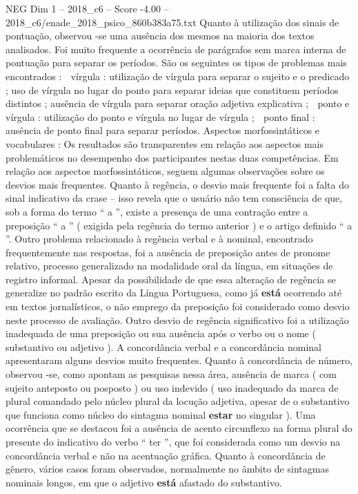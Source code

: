 \begin{textsample}{NEG Dim 1 – 2018\_c6 – Score -4.00 – 2018\_c6/enade\_2018\_psico\_860b383a75.txt}
Quanto à utilização dos sinais de pontuação, observou -se uma ausência dos mesmos na maioria dos textos analisados.
Foi muito frequente a ocorrência de parágrafos sem marca interna de pontuação para separar os períodos.
São os seguintes os tipos de problemas mais encontrados :  vírgula : utilização de vírgula para separar o sujeito e o predicado ; uso de vírgula no lugar do ponto para separar ideias que constituem períodos distintos ; ausência de vírgula para separar oração adjetiva explicativa ;  ponto e vírgula : utilização do ponto e vírgula no lugar de vírgula ;  ponto final : ausência de ponto final para separar períodos.
Aspectos morfossintáticos e vocabulares : Os resultados são transparentes em relação aos aspectos mais problemáticos no desempenho dos participantes nestas duas competências.
Em relação aos aspectos morfossintáticos, seguem algumas observações sobre os desvios mais frequentes.
Quanto à regência, o desvio mais frequente foi a falta do sinal indicativo da crase – isso revela que o usuário não tem consciência de que, sob a forma do termo “ a ”, existe a presença de uma contração entre a preposição “ a ” ( exigida pela regência do termo anterior ) e o artigo definido “ a ”.
Outro problema relacionado à regência verbal e à nominal, encontrado frequentemente nas respostas, foi a ausência de preposição antes de pronome relativo, processo generalizado na modalidade oral da língua, em situações de registro informal.
Apesar da possibilidade de que essa alteração de regência se generalize no padrão escrito da Língua Portuguesa, como já \textbf{está} ocorrendo até em textos jornalísticos, o não emprego da preposição foi considerado como desvio neste processo de avaliação.
Outro desvio de regência significativo foi a utilização inadequada de uma preposição ou sua ausência após o verbo ou o nome ( substantivo ou adjetivo ).
A concordância verbal e a concordância nominal apresentaram alguns desvios muito frequentes.
Quanto à concordância de número, observou -se, como apontam as pesquisas nessa área, ausência de marca ( com sujeito anteposto ou posposto ) ou uso indevido ( uso inadequado da marca de plural comandado pelo núcleo plural da locução adjetiva, apesar de o substantivo que funciona como núcleo do sintagma nominal \textbf{estar} no singular ).
Uma ocorrência que se destacou foi a ausência de acento circunflexo na forma plural do presente do indicativo do verbo “ ter ”, que foi considerada como um desvio na concordância verbal e não na acentuação gráfica.
Quanto à concordância de gênero, vários casos foram observados, normalmente no âmbito de sintagmas nominais longos, em que o adjetivo \textbf{está} afastado do substantivo.

\end{textsample}
